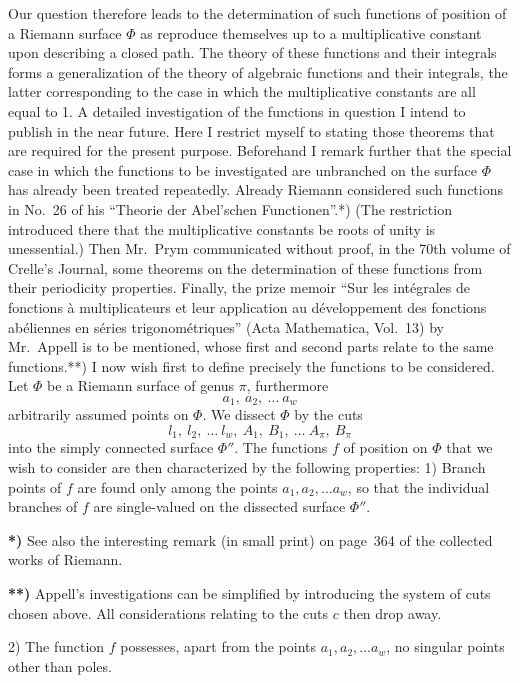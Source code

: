 \documentclass{article}
\begin{document}
Our question therefore leads to the determination of such functions of position of a Riemann surface $\Phi$ as reproduce themselves up to a multiplicative constant upon describing a closed path. The theory of these functions and their integrals forms a generalization of the theory of algebraic functions and their integrals, the latter corresponding to the case in which the multiplicative constants are all equal to 1. A detailed investigation of the functions in question I intend to publish in the near future. Here I restrict myself to stating those theorems that are required for the present purpose. Beforehand I remark further that the special case in which the functions to be investigated are unbranched on the surface $\Phi$ has already been treated repeatedly. Already Riemann considered such functions in No.~26 of his ``Theorie der Abel'schen Functionen''.*) (The restriction introduced there that the multiplicative constants be roots of unity is unessential.) Then Mr.~Prym communicated without proof, in the 70th volume of Crelle's Journal, some theorems on the determination of these functions from their periodicity properties. Finally, the prize memoir ``Sur les intégrales de fonctions à multiplicateurs et leur application au développement des fonctions abéliennes en séries trigonométriques'' (Acta Mathematica, Vol.~13) by Mr.~Appell is to be mentioned, whose first and second parts relate to the same functions.**) I now wish first to define precisely the functions to be considered. Let $\Phi$ be a Riemann surface of genus $\pi$, furthermore
\[
a_1, \ a_2, \ \dots \ a_w
\]
arbitrarily assumed points on $\Phi$. We dissect $\Phi$ by the cuts
\[
l_1, \ l_2, \ \dots \ l_w, \ A_1, \ B_1, \ \dots \ A_\pi, \ B_\pi
\]
into the simply connected surface $\Phi''$. The functions $f$ of position on $\Phi$ that we wish to consider are then characterized by the following properties:
1) Branch points of $f$ are found only among the points $a_1, a_2, \dots a_w$, so that the individual branches of $f$ are single-valued on the dissected surface $\Phi''$.

\textbf{*)} See also the interesting remark (in small print) on page~364 of the collected works of Riemann.

\textbf{**)} Appell's investigations can be simplified by introducing the system of cuts chosen above. All considerations relating to the cuts $c$ then drop away.

2) The function $f$ possesses, apart from the points $a_1, a_2, \dots a_w$, no singular points other than poles.
\end{document}

